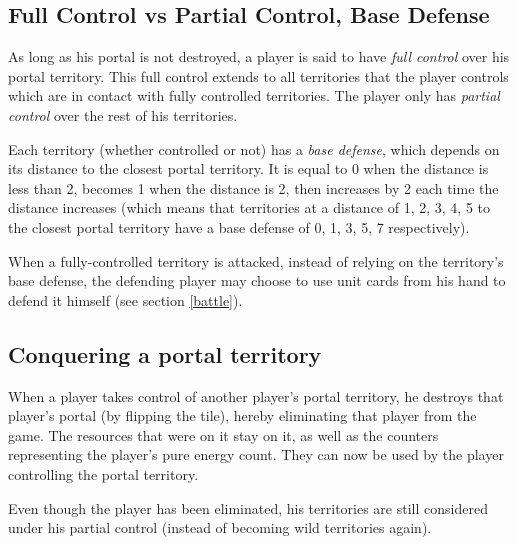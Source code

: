 \documentclass[a4paper]{article}
\begin{document}
    \subsection{Full Control vs Partial Control, Base Defense}
        \label{base-defense}
        As long as his portal is not destroyed,
        a player is said to have \textit{full control} over his portal territory.
        This full control extends to all territories that the player controls
        which are in contact with fully controlled territories.
        The player only has \textit{partial control} over the rest of his territories.
        
        Each territory (whether controlled or not) has a \textit{base defense},
        which depends on its distance to the closest portal territory.
        It is equal to 0  when the distance is less than 2,
        becomes 1 when the distance is 2,
        then increases by 2 each time the distance increases
        (which means that territories at a distance of 1, 2, 3, 4, 5
        to the closest portal territory have a base defense of  0, 1, 3, 5, 7
        respectively).
        
        When a fully-controlled territory is attacked,
        instead of relying on the territory's base defense,
        the defending player may choose to use unit cards from his hand to defend it
        himself (see section \ref{battle}).
        
    \subsection{Conquering a portal territory}
        When a player takes control of another player's portal territory,
        he destroys that player's portal (by flipping the tile),
        hereby eliminating that player from the game.
        The resources that were on it stay on it,
        as well as the counters representing the player's pure energy count.
        They can now be used by the player controlling the portal territory.
        
        Even though the player has been eliminated,
        his territories are still considered under his partial control
        (instead of becoming wild territories again).
        
\end{document}
